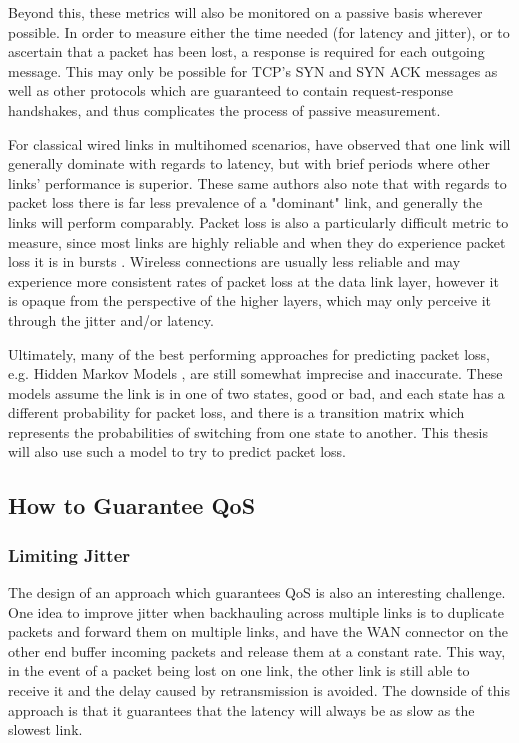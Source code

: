 Beyond this, these metrics will also be monitored on a passive basis wherever possible. In order to measure either the time needed (for latency and jitter), or to ascertain that a packet has been lost, a response is required for each outgoing message. This may only be possible for TCP's SYN and SYN ACK messages as well as other protocols which are guaranteed to contain request-response handshakes, and thus complicates the process of passive measurement.

For classical wired links in multihomed scenarios, \cite{tao2004exploring} have observed that one link will generally dominate with regards to latency, but with brief periods where other links' performance is superior. These same authors also note that with regards to packet loss there is far less prevalence of a "dominant" link, and generally the links will perform comparably. Packet loss is also a particularly difficult metric to measure, since most links are highly reliable and when they do experience packet loss it is in bursts \cite{tao2004exploring}. Wireless connections are usually less reliable and may experience more consistent rates of packet loss at the data link layer, however it is opaque from the perspective of the higher layers, which may only perceive it through the jitter and/or latency.

 Ultimately, many of the best performing approaches for predicting packet loss, e.g. Hidden Markov Models \cite{tao2004exploring, bremler2002predicting}, are still somewhat imprecise and inaccurate. These models assume the link is in one of two states, good or bad, and each state has a different probability for packet loss, and there is a transition matrix which represents the probabilities of switching from one state to another. This thesis will also use such a model to try to predict packet loss. 

\subsection{How to Guarantee QoS}

\subsubsection{Limiting Jitter}

The design of an approach which guarantees QoS is also an interesting challenge. One idea to improve jitter when backhauling across multiple links is to duplicate packets and forward them on multiple links, and have the WAN connector on the other end buffer incoming packets and release them at a constant rate. This way, in the event of a packet being lost on one link, the other link is still able to receive it and the delay caused by retransmission is avoided. The downside of this approach is that it guarantees that the latency will always be as slow as the slowest link.

